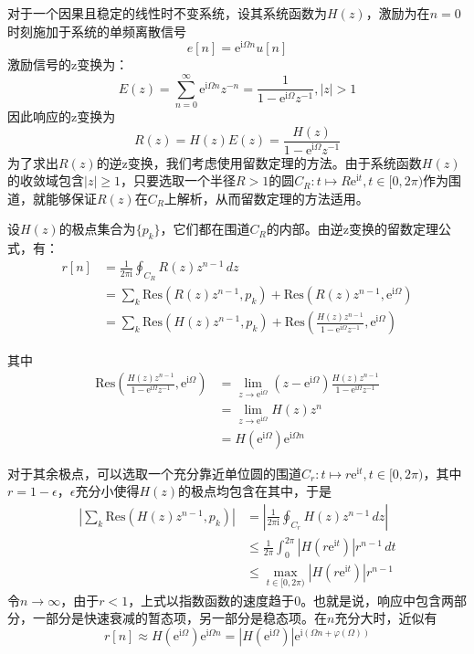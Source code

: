 \begin{example}
    对于一个因果且稳定的线性时不变系统，设其系统函数为$H(z)$，激励为在$n=0$时刻施加于系统的单频离散信号
    $$e[n]=\mathrm{e}^{\mathrm{i}\Omega n}u[n]$$
    激励信号的z变换为：
    $$E(z)=\sum_{n=0}^{\infty}\mathrm{e}^{\mathrm{i}\Omega n}z^{-n}=\frac{1}{1-\mathrm{e}^{\mathrm{i}\Omega}z^{-1}},|z|>1$$
    因此响应的z变换为
    $$R(z)=H(z)E(z)=\frac{H(z)}{1-\mathrm{e}^{\mathrm{i}\Omega}z^{-1}}$$
    为了求出$R(z)$的逆z变换，我们考虑使用留数定理的方法。由于系统函数$H(z)$的收敛域包含$|z|\geq 1$，只要选取一个半径$R>1$的圆$C_R:t\mapsto R\mathrm{e}^{\mathrm{i}t},t\in[0,2\pi)$作为围道，就能够保证$R(z)$在$C_R$上解析，从而留数定理的方法适用。

    设$H(z)$的极点集合为$\{p_k\}$，它们都在围道$C_R$的内部。由逆z变换的留数定理公式，有：\begin{align*}
        r[n]&=\frac{1}{2\pi\mathrm{i}}\oint_{C_R}R(z)z^{n-1}\,dz\\
        &=\sum_{k}\text{Res}(R(z)z^{n-1},p_k)+\text{Res}(R(z)z^{n-1},\mathrm{e}^{\mathrm{i}\Omega})\\
        &=\sum_{k}\text{Res}(H(z)z^{n-1},p_k)+\text{Res}\left(\frac{H(z)z^{n-1}}{1-\mathrm{e}^{\mathrm{i}\Omega}z^{-1}},\mathrm{e}^{\mathrm{i}\Omega}\right)
    \end{align*}

    其中\begin{align*}
        \text{Res}\left(\frac{H(z)z^{n-1}}{1-\mathrm{e}^{\mathrm{i}\Omega}z^{-1}},\mathrm{e}^{\mathrm{i}\Omega}\right)&=\lim_{z\to \mathrm{e}^{\mathrm{i}\Omega}}(z-\mathrm{e}^{\mathrm{i}\Omega})\frac{H(z)z^{n-1}}{1-\mathrm{e}^{\mathrm{i}\Omega}z^{-1}}\\
        &=\lim_{z\to \mathrm{e}^{\mathrm{i}\Omega}}H(z)z^n\\
        &=H(\mathrm{e}^{\mathrm{i}\Omega})\mathrm{e}^{\mathrm{i}\Omega n}
    \end{align*}

    对于其余极点，可以选取一个充分靠近单位圆的围道$C_r:t\mapsto r\mathrm{e}^{\mathrm{i}t},t\in[0,2\pi)$，其中$r=1-\epsilon$，$\epsilon$充分小使得$H(z)$的极点均包含在其中，于是\begin{align*}
        \left|\sum_{k}\text{Res}(H(z)z^{n-1},p_k)\right|&=\left|\frac{1}{2\pi\mathrm{i}}\oint_{C_r}H(z)z^{n-1}\,dz\right|\\
        &\leq \frac{1}{2\pi}\int_{0}^{2\pi}|H(r\mathrm{e}^{\mathrm{i}t})|r^{n-1}\,dt\\
        &\leq \max_{t\in[0,2\pi)}|H(r\mathrm{e}^{\mathrm{i}t})|r^{n-1}
    \end{align*}
    令$n\to\infty$，由于$r<1$，上式以指数函数的速度趋于$0$。也就是说，响应中包含两部分，一部分是快速衰减的暂态项，另一部分是稳态项。在$n$充分大时，近似有
    $$r[n]\approx H(\mathrm{e}^{\mathrm{i}\Omega})\mathrm{e}^{\mathrm{i}\Omega n}=|H(\mathrm{e}^{\mathrm{i}\Omega})|\mathrm{e}^{\mathrm{i}(\Omega n+\varphi(\Omega))}$$


\end{example}
